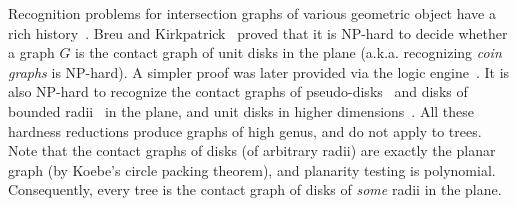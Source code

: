 Recognition problems for intersection graphs of various geometric object have a rich history~\cite{HK01}. Breu and Kirkpatrick~\cite{BK98} proved that it is NP-hard to decide whether a graph $G$ is the contact graph of unit disks in the plane (a.k.a. recognizing \emph{coin graphs} is NP-hard). A simpler proof was later provided via the logic engine~\cite{BET+99}. It is also NP-hard to recognize the contact graphs of pseudo-disks~\cite{HK01} and disks of bounded radii~\cite{BK95} in the plane, and unit disks in higher dimensions~\cite{Hli97,HK01}. All these hardness reductions produce graphs of high genus, and do not apply to trees. Note that the contact graphs of disks (of arbitrary radii) are exactly the planar graph (by Koebe's circle packing theorem), and planarity testing is polynomial. Consequently, every tree is the contact graph of disks of \emph{some} radii in the plane.
